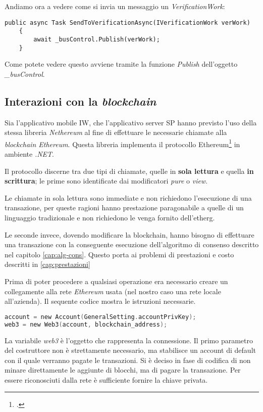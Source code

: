 Andiamo ora a vedere come si invia un messaggio un \emph{VerificationWork}:
\begin{lstlisting}[caption={codice invio di un messaggio}]
    public async Task SendToVerificationAsync(IVerificationWork verWork)
    {
        await _busControl.Publish(verWork);
    }
\end{lstlisting}

Come potete vedere questo avviene tramite la funzione \emph{Publish} dell'oggetto \emph{\_busControl}.

\subsection{Interazioni con la \emph{blockchain}}

Sia l'applicativo mobile IW, che l'applicativo server SP hanno previsto l'uso della stessa libreria \emph{Nethereum} al fine di effettuare le necessarie chiamate alla \emph{blockchain Ethereum}.
Questa libreria implementa il protocollo Ethereum\footcite{site:ethereum-yellow-paper} in ambiente \emph{.NET}.

Il protocollo discerne tra due tipi di chiamate, quelle in \textbf{sola lettura} e quella \textbf{in scrittura}; le prime sono identificate dai modificatori \emph{pure} o \emph{view}.

Le chiamate in sola lettura sono immediate e non richiedono l'esecuzione di una transazione, per queste ragioni hanno prestazione paragonabile a quelle di un linguaggio tradizionale e non richiedono le venga fornito dell'\gls{etherg}.

Le seconde invece, dovendo modificare la blockchain, hanno bisogno di effettuare una transazione con la conseguente esecuzione dell'algoritmo di consenso descritto nel capitolo \ref{cap:alg-cons}. Questo porta ai problemi di prestazioni e costo descritti in \ref{cap:prestazioni}

Prima di poter procedere a qualsiasi operazione era necessario creare un collegamente alla rete \emph{Ethereum} usata (nel nostro caso una rete locale all'azienda). Il sequente codice mostra le istruzioni necessarie.

\begin{lstlisting}[caption={Connessione alla rete di test},label={lst:connessione},language={C}]
account = new Account(GeneralSetting.accountPrivKey);
web3 = new Web3(account, blockchain_address);
\end{lstlisting}

La variabile \emph{web3} è l'oggetto che rappresenta la connessione. Il primo parametro del costruttore non è strettamente necessario, ma stabilisce un account di default con il quale verranno pagate le transazioni. Si è deciso in fase di codifica di non minare direttamente le aggiunte di blocchi, ma di pagare la transazione. Per essere riconosciuti dalla rete è sufficiente fornire la chiave privata. 
\medskip

